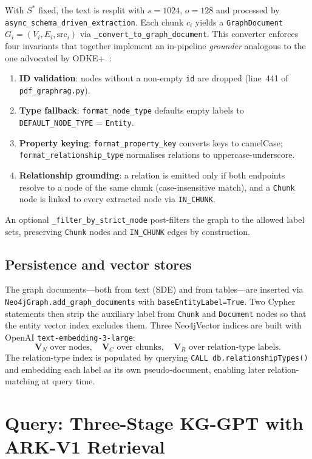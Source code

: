 \documentclass[11pt,a4paper]{article}
\begin{document}
With $S^\ast$ fixed, the text is resplit with $s=1024$, $o=128$ and processed
by \texttt{async\_schema\_driven\_extraction}. Each chunk $c_i$ yields a
\texttt{GraphDocument}
$G_i=(V_i,E_i,\text{src}_i)$ via \texttt{\_convert\_to\_graph\_document}.
This converter enforces four invariants that together implement an
in-pipeline \emph{grounder} analogous to the one advocated by
ODKE+~\cite{odkeplus2025}:
\begin{enumerate}
  \item \textbf{ID validation}: nodes without a non-empty \texttt{id} are
  dropped (line~441 of \texttt{pdf\_graphrag.py}).
  \item \textbf{Type fallback}: \texttt{format\_node\_type} defaults empty
  labels to \texttt{DEFAULT\_NODE\_TYPE} = \texttt{Entity}.
  \item \textbf{Property keying}: \texttt{format\_property\_key} converts keys
  to camelCase; \texttt{format\_relationship\_type} normalises relations to
  uppercase-underscore.
  \item \textbf{Relationship grounding}: a relation is emitted only if both
  endpoints resolve to a node of the same chunk (case-insensitive match), and
  a \texttt{Chunk} node is linked to every extracted node via
  \texttt{IN\_CHUNK}.
\end{enumerate}

An optional \texttt{\_filter\_by\_strict\_mode} post-filters the graph to the
allowed label sets, preserving \texttt{Chunk} nodes and \texttt{IN\_CHUNK}
edges by construction.

\subsection{Persistence and vector stores}

The graph documents---both from text (SDE) and from tables---are inserted via
\texttt{Neo4jGraph.add\_graph\_documents} with \texttt{baseEntityLabel=True}.
Two Cypher statements then strip the auxiliary label from \texttt{Chunk} and
\texttt{Document} nodes so that the entity vector index excludes them. Three
Neo4jVector indices are built with OpenAI \texttt{text-embedding-3-large}:
\[
\mathbf{V}_N\text{ over nodes},\quad
\mathbf{V}_C\text{ over chunks},\quad
\mathbf{V}_R\text{ over relation-type labels}.
\]
The relation-type index is populated by querying
\texttt{CALL db.relationshipTypes()} and embedding each label as its own
pseudo-document, enabling later relation-matching at query time.

\section{Query: Three-Stage KG-GPT with ARK-V1 Retrieval}
\label{sec:query}
\end{document}
